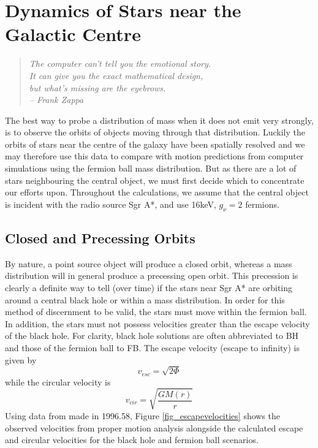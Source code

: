 \section{Dynamics of Stars near the Galactic Centre}
\begin{quotation}
	\raggedleft \it The computer can't tell you the emotional story. \\ It can give you the exact mathematical design, \\
	but what's missing are the eyebrows. \\ -- Frank Zappa
\end{quotation}
The best way to probe a distribution of mass when it does not emit very strongly, is to observe the orbits of objects moving
through that distribution. Luckily the orbits of stars near the centre of the galaxy have been spatially resolved
\cite{ref_ghezorbits, ref_eckartorbits} and we may therefore use this data to compare with motion predictions from computer
simulations using the fermion ball mass distribution. But as there are a lot of stars neighbouring the central object, we must
first decide which to concentrate our efforts upon. Throughout the calculations, we assume that the central object is incident
with the radio source Sgr A*, and use 16keV, $g_\nu=2$ fermions.

\subsection{Closed and Precessing Orbits}
By nature, a point source object will produce a closed orbit, whereas a mass distribution will in general produce a precessing open orbit.
This precession is clearly a definite way to tell (over time) if the stars near Sgr A* are orbiting around a central black hole or within a mass
distribution. In order for this method of discernment to be valid, the stars must move within the fermion ball. In addition,
the stars must not possess velocities greater than the escape velocity of the black hole.
For clarity, black hole solutions are often abbreviated to BH and those of the fermion ball to FB. The escape velocity
(escape to infinity) is given by
\begin{equation}
	v_{esc}=\sqrt{2 \Phi }
	\label{eqn_escapevelocity}
\end{equation}
while the circular velocity is
\begin{equation}
	v_{cir}=\sqrt{\frac{G M(r)}{r}}
	\label{eqn_circularvelocity}
\end{equation}
Using data from \cite{ref_ghezmotion} made in 1996.58, Figure \ref{fig_escapevelocities} shows the observed velocities from
proper motion analysis alongside the calculated escape and circular velocities for the black hole and fermion ball scenarios.

